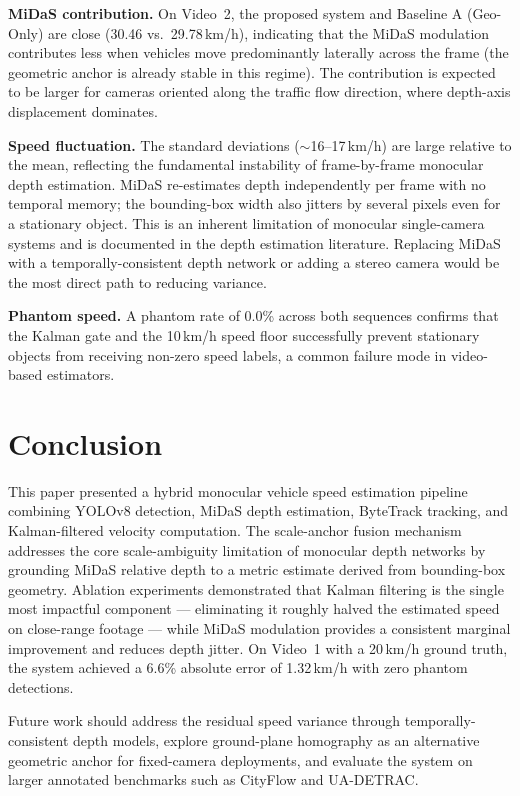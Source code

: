 \documentclass[conference]{IEEEtran}
\begin{document}
\textbf{MiDaS contribution.}
On Video~2, the proposed system and Baseline A (Geo-Only) are
close (30.46 vs.\ 29.78\,km/h), indicating that the MiDaS
modulation contributes less when vehicles move predominantly
laterally across the frame (the geometric anchor is already
stable in this regime). The contribution is expected to be
larger for cameras oriented along the traffic flow direction,
where depth-axis displacement dominates.

\textbf{Speed fluctuation.}
The standard deviations ($\sim$16--17\,km/h) are large relative
to the mean, reflecting the fundamental instability of
frame-by-frame monocular depth estimation. MiDaS re-estimates
depth independently per frame with no temporal memory; the
bounding-box width also jitters by several pixels even for
a stationary object. This is an inherent limitation of
monocular single-camera systems and is documented in the
depth estimation literature. Replacing MiDaS with a
temporally-consistent depth network or adding a stereo camera
would be the most direct path to reducing variance.

\textbf{Phantom speed.}
A phantom rate of 0.0\% across both sequences confirms that
the Kalman gate and the 10\,km/h speed floor successfully
prevent stationary objects from receiving non-zero speed labels,
a common failure mode in video-based estimators.

\section{Conclusion}

This paper presented a hybrid monocular vehicle speed
estimation pipeline combining YOLOv8 detection, MiDaS
depth estimation, ByteTrack tracking, and Kalman-filtered
velocity computation. The scale-anchor fusion mechanism
addresses the core scale-ambiguity limitation of monocular
depth networks by grounding MiDaS relative depth to a
metric estimate derived from bounding-box geometry. Ablation
experiments demonstrated that Kalman filtering is the single
most impactful component --- eliminating it roughly halved
the estimated speed on close-range footage --- while MiDaS
modulation provides a consistent marginal improvement and
reduces depth jitter. On Video~1 with a 20\,km/h ground
truth, the system achieved a 6.6\% absolute error of
1.32\,km/h with zero phantom detections.

Future work should address the residual speed variance
through temporally-consistent depth models, explore
ground-plane homography as an alternative geometric anchor
for fixed-camera deployments, and evaluate the system on
larger annotated benchmarks such as CityFlow and UA-DETRAC.
\end{document}
